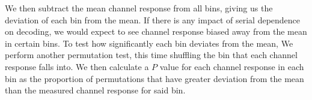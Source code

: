 \documentclass[../main.tex]{subfiles}
\begin{document}
We then subtract the mean channel response from all bins, giving us the deviation of each bin from the mean. If there is any impact of serial dependence on decoding, we would expect to see channel response biased away from the mean in certain bins. To test how significantly each bin deviates from the mean, We perform another permutation test, this time shuffling the bin that each channel response falls into. We then calculate a $P$ value for each channel response in each bin as the proportion of permutations that have greater deviation from the mean than the measured channel response for said bin.
\end{document}
